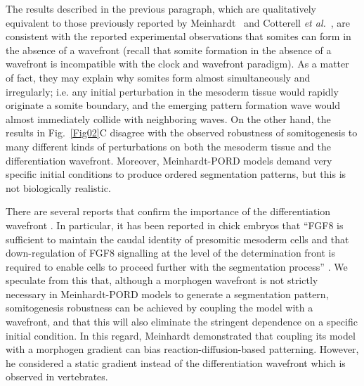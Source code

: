 \documentclass[%
 preprint,
 aip, 
 amsmath,amssymb,
]{revtex4-2}
\begin{document}
The results described in the previous paragraph, which are qualitatively equivalent to those previously reported by Meinhardt~\cite{Meinhardt1982} and Cotterell \emph{et al.}~\citep{Cotterell2015}, are consistent with the reported experimental observations that somites can form in the absence of a wavefront (recall that somite formation in the absence of a wavefront is incompatible with the clock and wavefront paradigm). As a matter of fact, they may explain why somites form almost simultaneously and irregularly; i.e. any initial perturbation in the mesoderm tissue would rapidly originate a somite boundary, and the emerging pattern formation wave would almost immediately collide with neighboring waves. On the other hand, the results in Fig.~\ref{Fig02}C disagree with the observed robustness of somitogenesis to many different kinds of perturbations on both the mesoderm tissue and the differentiation wavefront. Moreover, Meinhardt-PORD models demand very specific initial conditions to produce ordered segmentation patterns, but this is not biologically realistic. 

There are several reports that confirm the importance of the differentiation wavefront \cite{Naiche2011, Sawada2001}. In particular, it has been reported in chick embryos that ``FGF8 is sufficient to maintain the caudal identity of presomitic mesoderm cells and that down-regulation of FGF8 signalling at the level of the determination front is required to enable cells to proceed further with the segmentation process'' \cite{Dubrulle2001}. We speculate from this that, although a morphogen wavefront is not strictly necessary in Meinhardt-PORD models to generate a segmentation pattern, somitogenesis robustness can be achieved by coupling the model with a wavefront, and that this will also eliminate the stringent dependence on a specific initial condition. In this regard, Meinhardt \cite{Meinhardt1982} demonstrated that coupling its model with a morphogen gradient can bias reaction-diffusion-based patterning. However, he considered a static gradient instead of the differentiation wavefront which is observed in vertebrates.
	
\end{document}
